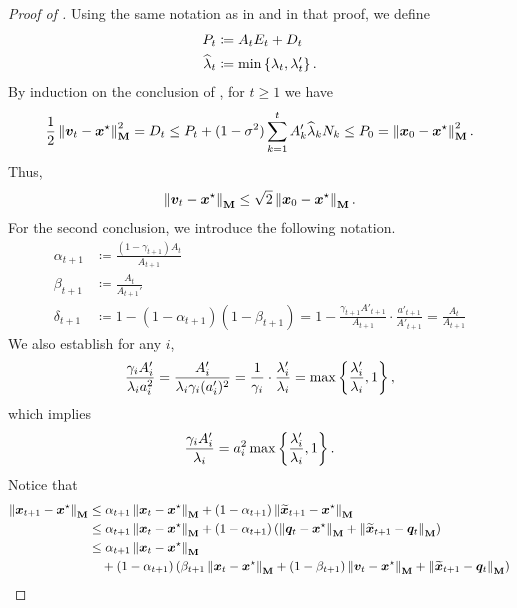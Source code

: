 \begin{proof}[Proof of ]
Using the same notation as in  and in that proof, we define
\begin{align*}
    P_t &\coloneqq A_tE_t+D_t \\
    \widehat{\lambda}_t &\coloneqq \min\left\{\lambda_t,\lambda_t'\right\}.
\end{align*}
By induction on the conclusion of , for $t\ge 1$ we have
\begin{align*}
    \frac{1}{2}\left\lVert \bm{v}_t-\bm{x}^{\star} \right\rVert_{\mathbf{M}}^2 = D_t \le P_t + (1-\sigma^2)\sum_{k=1}^t A_k'\widehat{\lambda}_kN_k \le P_0 = \left\lVert \bm{x}_0-\bm{x}^{\star} \right\rVert_{\mathbf{M}}^2.
\end{align*}
Thus,
\begin{align*}
    \left\lVert \bm{v}_t-\bm{x}^{\star} \right\rVert_{\mathbf{M}} \le \sqrt{2}\left\lVert \bm{x}_0-\bm{x}^{\star} \right\rVert_{\mathbf{M}}.
\end{align*}
For the second conclusion, we introduce the following notation.
\begin{align*}
    \alpha_{t+1} &\coloneqq \frac{(1-\gamma_{t+1})A_t}{A_{t+1}} \\
    \beta_{t+1} &\coloneqq \frac{A_t}{A_{t+1}'} \\
    \delta_{t+1} &\coloneqq 1-(1-\alpha_{t+1})(1-\beta_{t+1}) = 1 - \frac{\gamma_{t+1}A'_{t+1}}{A_{t+1}} \cdot \frac{a'_{t+1}}{A'_{t+1}} = \frac{A_t}{A_{t+1}}
\end{align*}
We also establish for any $i$,
\begin{align*}
    \frac{\gamma_i A_i'}{\lambda_i a_i^2} = \frac{A_i'}{\lambda_i \gamma_i (a_i')^2} = \frac{1}{\gamma_i} \cdot \frac{\lambda_i'}{\lambda_i} = \max\left\{\frac{\lambda_i'}{\lambda_i}, 1\right\},
\end{align*}
which implies
\begin{align*}
    \frac{\gamma_i A_i'}{\lambda_i} = a_i^2\max\left\{\frac{\lambda_i'}{\lambda_i}, 1\right\}.
\end{align*}
Notice that
\begin{align*}
    \norm{\vx_{t+1}-\xstar}_{\mM} &\le \alpha_{t+1}\norm{\vx_t-\xstar}_{\mM} + (1-\alpha_{t+1})\norm{\xtilde_{t+1}-\xstar}_{\mM} \\
    &\le \alpha_{t+1}\norm{\vx_t-\xstar}_{\mM} + (1-\alpha_{t+1})\inparen{\norm{\vq_t-\xstar}_{\mM}+\norm{\xtilde_{t+1}-\vq_t}_{\mM}} \\
    &\le \alpha_{t+1}\norm{\vx_t-\xstar}_{\mM} \\
    &\quad + (1-\alpha_{t+1})\inparen{\beta_{t+1}\norm{\vx_t-\xstar}_{\mM}+(1-\beta_{t+1})\norm{\vv_t-\xstar}_{\mM}+\norm{\xtilde_{t+1}-\vq_t}_{\mM}} \\

\end{align*}
\end{proof}
